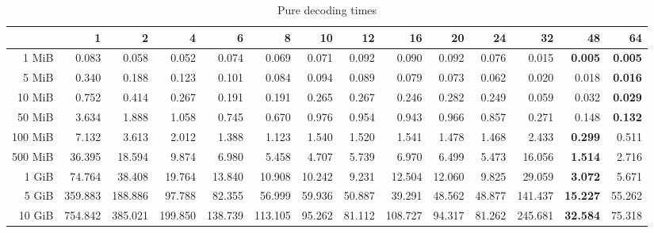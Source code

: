 \begin{centering}
\begin{table}[!h]
	\caption{Pure decoding times}
	\begin{tabular}{rrrrrrrrrrrrrr}
		\toprule
		\diagbox[width=7em]{Size}{Threads} &      1  &      2  &      4  &      6  &      8  &     10 &     12 &      16 &     20 &     24 &      32 &     48 &     64 \\
		\midrule
		1 MiB   &   0.083 &   0.058 &   0.052 &   0.074 &   0.069 &  0.071 &  0.092 &   0.090 &  0.092 &  0.076 &   0.015 &  \textbf{0.005} &  \textbf{0.005} \\
		5 MiB   &   0.340 &   0.188 &   0.123 &   0.101 &   0.084 &  0.094 &  0.089 &   0.079 &  0.073 &  0.062 &   0.020 &  0.018 &  \textbf{0.016} \\
		10 MiB  &   0.752 &   0.414 &   0.267 &   0.191 &   0.191 &  0.265 &  0.267 &   0.246 &  0.282 &  0.249 &   0.059 &  0.032 &  \textbf{0.029} \\
		50 MiB  &   3.634 &   1.888 &   1.058 &   0.745 &   0.670 &  0.976 &  0.954 &   0.943 &  0.966 &  0.857 &   0.271 &  0.148 &  \textbf{0.132} \\
		100 MiB &   7.132 &   3.613 &   2.012 &   1.388 &   1.123 &  1.540 &  1.520 &   1.541 &  1.478 &  1.468 &   2.433 &  \textbf{0.299} &  0.511 \\
		500 MiB &  36.395 &  18.594 &   9.874 &   6.980 &   5.458 &  4.707 &  5.739 &   6.970 &  6.499 &  5.473 &  16.056 &  \textbf{1.514} &  2.716 \\
		1 GiB   &  74.764 &  38.408 &  19.764 &  13.840 &  10.908 & 10.242 &  9.231 &  12.504 & 12.060 &  9.825 &  29.059 &  \textbf{3.072} &  5.671 \\
		5 GiB   & 359.883 & 188.886 &  97.788 &  82.355 &  56.999 & 59.936 & 50.887 &  39.291 & 48.562 & 48.877 & 141.437 & \textbf{15.227} & 55.262 \\
		10 GiB  & 754.842 & 385.021 & 199.850 & 138.739 & 113.105 & 95.262 & 81.112 & 108.727 & 94.317 & 81.262 & 245.681 & \textbf{32.584} & 75.318 \\
		\bottomrule
	\end{tabular}
\end{table}


\end{centering}
